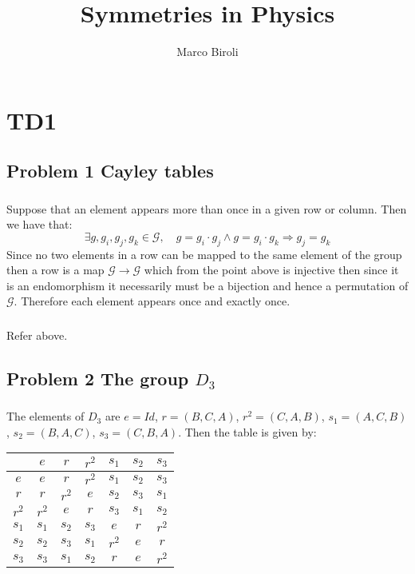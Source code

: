 \documentclass[10pt,a4paper]{book}
\title{Symmetries in Physics}
\author{Marco Biroli}
\begin{document}
\maketitle

\chapter{TD1}
\section{Problem 1 Cayley tables}
\subsection{}
Suppose that an element appears more than once in a given row or column. Then we have that:
\[
\exists g, g_i, g_j, g_k \in \mathcal{G}, \quad g = g_i \cdot g_j \land g = g_i \cdot g_k \Rightarrow g_j = g_k
\]
Since no two elements in a row can be mapped to the same element of the group then a row is a map $\mathcal{G} \to \mathcal{G}$ which from the point above is injective then since it is an endomorphism it necessarily must be a bijection and hence a permutation of $\mathcal{G}$. Therefore each element appears once and exactly once.

\subsection{}
Refer above.

\section{Problem 2 The group $D_3$}
\subsection{}
The elements of $D_3$ are $e = Id$, $r = (B, C, A)$, $r^2 = (C, A, B)$, $s_1 = (A, C, B)$, $s_2 = (B, A, C)$, $s_3 = (C, B, A)$. Then the table is given by:
\begin{center}
\begin{tabular}{ c | c | c | c | c | c | c }
 & $e$ & $r$ & $r^2$ & $s_1$ & $s_2$ & $s_3$\\
 \hline
 $e$ & $e$ & $r$ & $r^2$ & $s_1$ & $s_2$ & $s_3$ \\
 \hline
 $r$ & $r$ & $r^2$ & $e$ & $s_2$ & $s_3$ & $s_1$ \\
 \hline 
 $r^2$ & $r^2$ & $e$ & $r$ & $s_3$ & $s_1$ & $s_2$\\
 \hline
 $s_1$ & $s_1$ & $s_2$ & $s_3$ & $e$ & $r$ & $r^2$\\
 \hline
 $s_2$ & $s_2$ & $s_3$ & $s_1$ & $r^2$ & $e$ & $r$\\
 \hline 
 $s_3$ & $s_3$ & $s_1$ & $s_2$ & $r$ & $e$ & $r^2$
\end{tabular}
\end{center}
\end{document}
